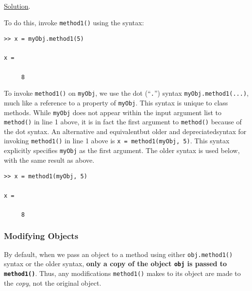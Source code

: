 

\noindent \underline{Solution}.

To do this, invoke \texttt{method1()} using the syntax:
\begin{lstlisting}[style=Matlab-editor]
>> x = myObj.method1(5)

x =

     8
\end{lstlisting}
To invoke \texttt{method1()} on \texttt{myObj}, we use the dot (``\texttt{.}'') syntax \texttt{myObj.method1(...)}, much like a reference to a property of \texttt{myObj}. This syntax is unique to class methods. While \texttt{myObj} does not appear within the input argument list to \texttt{method()} in line 1 above, it is in fact the first argument to \texttt{method()} because of the dot syntax. An alternative and equivalent\textemdash but older and depreciated\textemdash syntax for invoking \texttt{method1()} in line 1 above is \verb!x = method1(myObj, 5)!. This syntax explicitly specifies \texttt{myObj} as the first argument. The older syntax is used below, with the same result as above.
\begin{lstlisting}[style=Matlab-editor]
>> x = method1(myObj, 5)

x =

     8
\end{lstlisting}

\subsubsection{Modifying Objects}
By default, when we pass an object to a method using either \texttt{obj.method1()} syntax or the older syntax, \textbf{only a copy of the object \texttt{obj} is passed to \texttt{method1()}}. Thus, any modifications \texttt{method1()} makes to its object are made to the \textit{copy}, not the original object.

